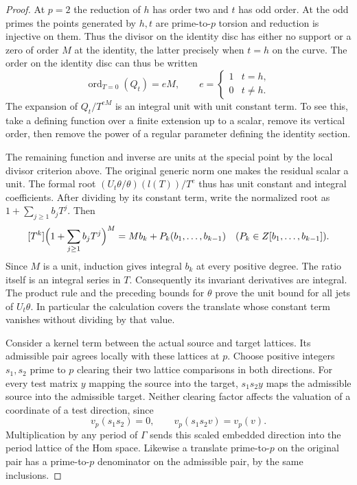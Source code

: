 \begin{proof}
At \(p=2\) the reduction of \(h\) has order two and \(t\)
has odd order. At the odd primes the points generated by
\(h,t\) are prime-to-\(p\) torsion and reduction is injective
on them. Thus the divisor on the identity disc has either
no support or a zero of order \(M\) at the identity, the
latter precisely when \(t=h\) on the curve. The order on the identity disc can thus be written
\[
  \operatorname{ord}_{T=0}(Q_t)=eM,\qquad e=\begin{cases}1&t=h,\\0&t\ne h.\end{cases}
\]
 The expansion of \(Q_t/T^{eM}\)
is an integral unit with unit constant term. To see this, take
a defining function over a finite extension up to a scalar,
remove its vertical order, then remove the power of a regular
parameter defining the identity section.

The remaining
function and inverse are units at the special point by the
local divisor criterion above. The original generic norm
one makes the residual scalar a unit. The formal root
\((U_t\theta/\theta)(l(T))/T^e\) thus has unit constant and
integral coefficients. After dividing by its constant term,
write the normalized root as \(1+\sum_{j\ge1}b_j T^j\).
Then
\[
 [T^k]\Bigl(1+\sum_{j\ge1}b_j T^j\Bigr)^M
      =M b_k+P_k(b_1,\ldots,b_{k-1})
             \quad(P_k\in\mathbb Z[b_1,\ldots,b_{k-1}]).
\]
Since \(M\) is a unit, induction gives integral \(b_k\)
at every positive degree. The ratio itself is an integral series in \(T\).
Consequently its invariant derivatives are integral. The
product rule and the preceding bounds for \(\theta\) prove
the unit bound for all jets of \(U_t\theta\). In particular
the calculation covers the translate whose constant term
vanishes without dividing by that value.


Consider a kernel term between the actual source and target
lattices. Its admissible pair agrees locally with these
lattices at \(p\). Choose positive integers \(s_1,s_2\)
prime to \(p\) clearing their two lattice comparisons in both
directions. For every test matrix \(y\) mapping the source
into the target, \(s_1s_2 y\) maps the admissible source into
the admissible target.
Neither clearing factor affects the valuation of a coordinate of a test direction, since
\[
  v_p(s_1s_2)=0,\qquad v_p(s_1s_2v)=v_p(v).
\]
 Multiplication by any period of
\(\Gamma\) sends this scaled embedded direction into the
period lattice of the Hom space. Likewise a translate
prime-to-\(p\) on the original pair has a prime-to-\(p\)
denominator on the admissible pair, by the same inclusions.


\end{proof}
